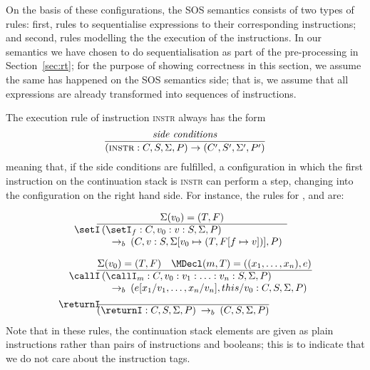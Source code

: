 On the basis of these configurations, the SOS semantics consists of two types
of rules: first, rules to sequentialise expressions to their corresponding
instructions; and second, rules modelling the the execution of the
instructions. In our semantics we have chosen to do sequentialisation as part
of the pre-processing in Section~\ref{sec:rt}; for the purpose of showing
correctness in this section, we assume the same has happened on the SOS
semantics side; that is, we assume that all expressions are already transformed
into sequences of instructions.

The execution rule of instruction \textsc{instr} always has the form
\[ \frac
       {\mathit{side~conditions}}
       {(\textsc{instr}:C,S,\Sigma,P) \rightarrow (C',S',\Sigma',P')}
\]
meaning that, if the side conditions are fulfilled, a configuration in which
the first instruction on the continuation stack is \textsc{instr} can perform a
step, changing into the configuration on the right hand side. For instance, the
rules for \setI{}, \callI{} and \returnI{} are:

\begin{eqnarray*}
\setI \!\! & \begin{array}{@{}c@{}}
\Sigma(v_0) = (T, F) \\
\hline
\begin{array}{l}
(\setI_f:C, v_0:v:S, \Sigma,P)\\
\quad\rightarrow_b \: (C,v:S, \Sigma[v_0 \mapsto (T, F[f \mapsto v])],P)
\end{array}
\end{array}
\\[\medskipamount]
\callI \!\! & \begin{array}{@{}c@{}}
\Sigma(v_0) = (T, F) \quad \MDecl(m,T)=((x_1,\dotsc,x_n),e) \\
\hline
\begin{array}{l}
(\callI_m:C,v_0:v_1:\dotsc:v_n:S, \Sigma,P)\\
\quad \rightarrow_b \: (e[x_1/v_1,\dotsc,x_n/v_n],this/v_0:C, S, \Sigma,P)
\end{array}
\end{array}
\\[-\medskipamount]
\returnI \!\!& \begin{array}{@{}c@{}}
\: \\
\hline
(\returnI:C,S,\Sigma,P) \: \rightarrow_b \: (C,S,\Sigma,P)
\end{array}
\end{eqnarray*}
%
Note that in these rules, the continuation stack elements are given as plain
instructions rather than pairs of instructions and booleans; this is to
indicate that we do not care about the instruction tags.

